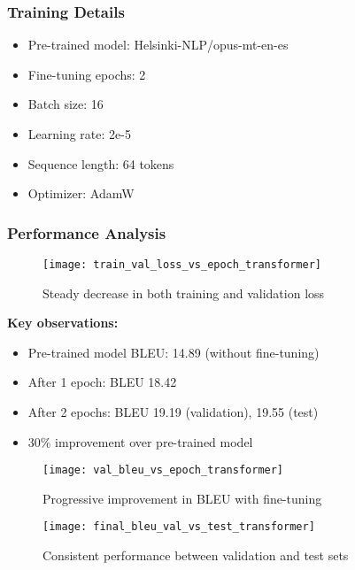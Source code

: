 \documentclass[12pt]{article}
\begin{document}
\subsubsection*{Training Details}
\begin{itemize}
    \item Pre-trained model: Helsinki-NLP/opus-mt-en-es
    \item Fine-tuning epochs: 2
    \item Batch size: 16
    \item Learning rate: 2e-5
    \item Sequence length: 64 tokens
    \item Optimizer: AdamW
\end{itemize}

\subsubsection*{Performance Analysis}

\begin{figure}[H]
    \centering
    \texttt{[image: train\_val\_loss\_vs\_epoch\_transformer]}
    \caption{Steady decrease in both training and validation loss}
\end{figure}

\textbf{Key observations:}
\begin{itemize}
    \item Pre-trained model BLEU: 14.89 (without fine-tuning)
    \item After 1 epoch: BLEU 18.42
    \item After 2 epochs: BLEU 19.19 (validation), 19.55 (test)
    \item 30\% improvement over pre-trained model
\end{itemize}

\begin{figure}[H]
    \centering
    \texttt{[image: val\_bleu\_vs\_epoch\_transformer]}
    \caption{Progressive improvement in BLEU with fine-tuning}
\end{figure}

\begin{figure}[H]
    \centering
    \texttt{[image: final\_bleu\_val\_vs\_test\_transformer]}
    \caption{Consistent performance between validation and test sets}
\end{figure}
\end{document}
